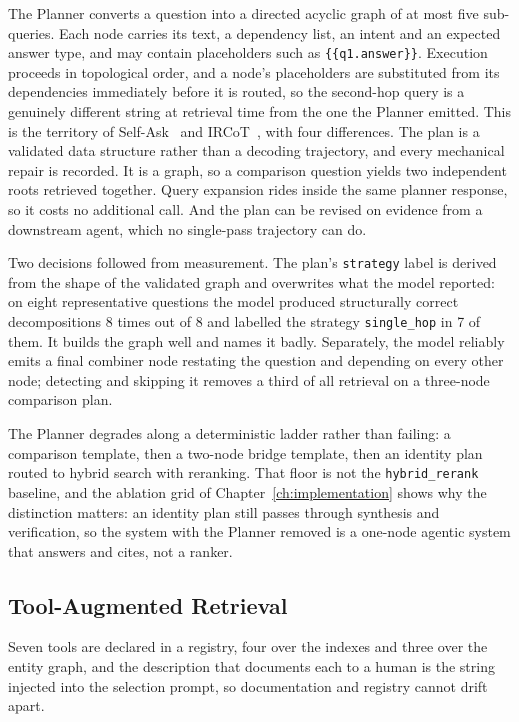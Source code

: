 The Planner converts a question into a directed acyclic graph of at most five
sub-queries. Each node carries its text, a dependency list, an intent and an
expected answer type, and may contain placeholders such as
\texttt{\{\{q1.answer\}\}}. Execution proceeds in topological order, and a
node's placeholders are substituted from its dependencies immediately before it
is routed, so the second-hop query is a genuinely different string at
retrieval time from the one the Planner emitted. This is the territory of
Self-Ask~\cite{press2023selfask} and IRCoT~\cite{trivedi2023interleaving},
with four differences. The plan is a validated data structure rather than a
decoding trajectory, and every mechanical repair is recorded. It is a graph,
so a comparison question yields two independent roots retrieved together.
Query expansion rides inside the same planner response, so it costs no
additional call. And the plan can be revised on evidence from a downstream
agent, which no single-pass trajectory can do.

Two decisions followed from measurement. The plan's \texttt{strategy} label is
derived from the shape of the validated graph and overwrites what the model
reported: on eight representative questions the model produced structurally
correct decompositions 8 times out of 8 and labelled the strategy
\texttt{single\_hop} in 7 of them. It builds the graph well and names it badly.
Separately, the model reliably emits a final combiner node restating the
question and depending on every other node; detecting and skipping it removes
a third of all retrieval on a three-node comparison plan.

The Planner degrades along a deterministic ladder rather than failing: a
comparison template, then a two-node bridge template, then an identity plan
routed to hybrid search with reranking. That floor is not the
\texttt{hybrid\_rerank} baseline, and the ablation grid of
Chapter~\ref{ch:implementation} shows why the distinction matters: an identity
plan still passes through synthesis and verification, so the system with the
Planner removed is a one-node agentic system that answers and cites, not a
ranker.

\subsection{Tool-Augmented Retrieval}
\label{sec:tools}

Seven tools are declared in a registry, four over the indexes and three over
the entity graph, and the description that documents each to a human is the
string injected into the selection prompt, so documentation and registry
cannot drift apart.

